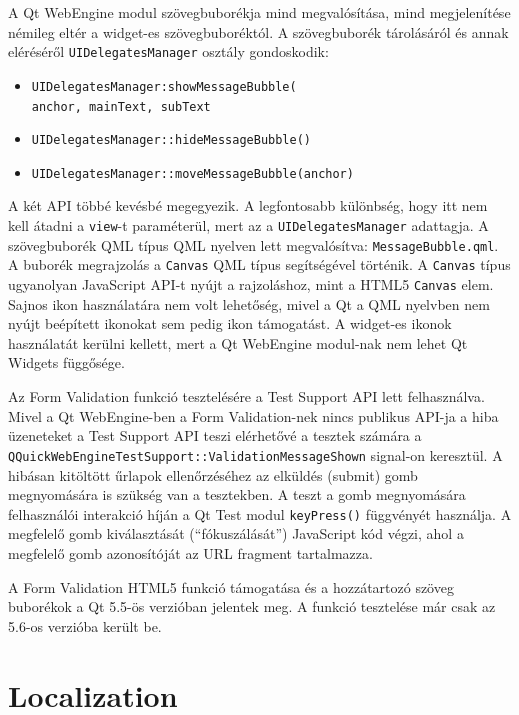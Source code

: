 \documentclass[12pt]{report}
\begin{document}
A Qt WebEngine modul szövegbuborékja mind megvalósítása, mind megjelenítése némileg eltér
a widget-es szövegbuboréktól. A szövegbuborék tárolásáról és annak eléréséről
\texttt{UIDelegatesManager} osztály gondoskodik:
\begin{itemize}
    \item \texttt{UIDelegatesManager:showMessageBubble(} \\
                    \texttt{anchor, mainText, subText}
    \item \texttt{UIDelegatesManager::hideMessageBubble()}
    \item \texttt{UIDelegatesManager::moveMessageBubble(anchor)}
\end{itemize}
A két API többé kevésbé megegyezik. A legfontosabb különbség, hogy itt nem kell átadni a
\texttt{view}-t paraméterül, mert az a \texttt{UIDelegatesManager} adattagja. A szövegbuborék
QML típus QML nyelven lett megvalósítva: \texttt{MessageBubble.qml}. A buborék
megrajzolás a \texttt{Canvas} QML típus segítségével történik. A \texttt{Canvas} típus
ugyanolyan JavaScript API-t nyújt a rajzoláshoz, mint a HTML5 \texttt{Canvas} elem.
Sajnos ikon használatára nem volt lehetőség, mivel a Qt a QML nyelvben nem nyújt beépített
ikonokat sem pedig ikon támogatást. A widget-es ikonok használatát kerülni kellett, mert
a Qt WebEngine modul-nak nem lehet Qt Widgets függősége.

Az Form Validation funkció tesztelésére a Test Support API lett felhasználva. Mivel a
Qt WebEngine-ben a Form Validation-nek nincs publikus API-ja a hiba üzeneteket a
Test Support API teszi elérhetővé a tesztek számára a \\
\texttt{QQuickWebEngineTestSupport::ValidationMessageShown}
signal-on keresztül. A hibásan kitöltött űrlapok ellenőrzéséhez az elküldés (submit) gomb
megnyomására is szükség van a tesztekben. A teszt a gomb megnyomására felhasználói interakció
híján a Qt Test modul \texttt{keyPress()} függvényét használja. A megfelelő gomb
kiválasztását (``fókuszálását'') JavaScript kód végzi, ahol a megfelelő gomb azonosítóját
az URL fragment tartalmazza.

A Form Validation HTML5 funkció támogatása és a hozzátartozó szöveg buborékok a Qt 5.5-ös
verzióban jelentek meg. A funkció tesztelése már csak az 5.6-os verzióba került be.

\section{Localization}
\end{document}
